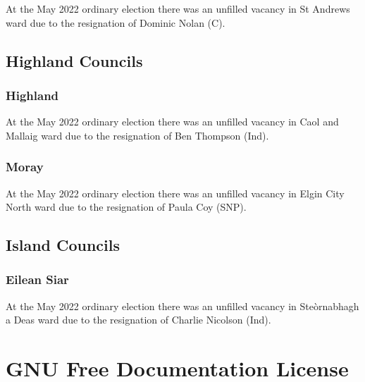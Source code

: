 \documentclass[a4paper,openany]{book}
\begin{document}
\begin{resultsiii}
At the May 2022 ordinary election there was an unfilled vacancy in St Andrews ward due to the resignation of Dominic Nolan (C).%

\section{Highland Councils}

\subsection*{Highland}

At the May 2022 ordinary election there was an unfilled vacancy in Caol and Mallaig ward due to the resignation of Ben Thompson (Ind).%

\subsection*{Moray}

At the May 2022 ordinary election there was an unfilled vacancy in Elgin City North ward due to the resignation of Paula Coy (SNP).%

\section{Island Councils}

\subsection*{Eilean Siar}

At the May 2022 ordinary election there was an unfilled vacancy in Steòrnabhagh a Deas ward due to the resignation of Charlie Nicolson (Ind).%

\end{resultsiii}

\clearpage
{}
{\scriptsize%
\frenchspacing\printindex}
\thispagestyle{plain}

\chapter*{{GNU Free Documentation License}}
\pagestyle{plain}
\end{document}

